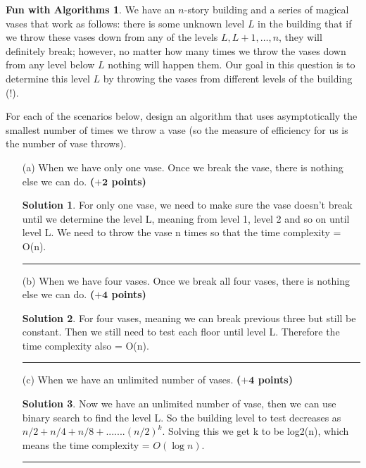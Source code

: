 \documentclass{article}
\theoremstyle{definition}
\newtheorem*{fun}{Fun with Algorithms}
\def\fline{\rule{0.75\linewidth}{0.5pt}}
\newcommand{\finishline}{\begin{center}\fline\end{center}}
\newtheorem*{solution*}{Solution}
\newenvironment{solution}{\begin{solution*}}{{\finishline} \end{solution*}}
\newcommand{\grade}[1]{\hfill{\textbf{($\mathbf{#1}$ points)}}}
\begin{document}
\begin{fun}
	We have an $n$-story building and a series of magical vases that work as follows: there is some unknown level $L$ in the building that if we throw these vases down from any of the levels $L,L+1,\ldots,n$, they will definitely break; however, 
	no matter how many times we throw the vases down from any level below $L$ nothing will happen them. Our goal in this question is to determine this level $L$ by throwing the vases from different levels of the building (!). 
	
	For each of the scenarios below, design an algorithm that uses asymptotically the smallest number of times we throw a vase (so the measure of efficiency for us is the number of vase throws). 
	\begin{enumerate}
	\item[(a)] When we have only one vase. Once we break the vase, there is nothing else we can do. \grade{+2} 
	
	
    	\begin{solution}
		For only one vase, we need to make sure the vase doesn't break until we determine the level L, meaning from level 1, level 2 and so on until level L. We need to throw the vase n times so that the time complexity = O(n).
\end{solution}


	\item[(b)] When we have  four vases. Once we break all four vases, there is nothing else we can do. \grade{+4} 
	

    	\begin{solution}
		For four vases, meaning we can break previous three but still be constant. Then we still need to test each floor until level L. Therefore the time complexity also = O(n).
\end{solution}


	\item[(c)] When we have an unlimited number of vases.  \grade{+4} 
	
	
    	\begin{solution}
		Now we have an unlimited number of vase, then we can use binary search to find the level L. So the building level to test decreases as $n/2 + n/4 + n/8 +....... (n/2)^k$. Solving this we get k to be log2(n), which means the time 		complexity = $O(\log n)$.
\end{solution}


	\end{enumerate}
\end{fun}
\end{document}

